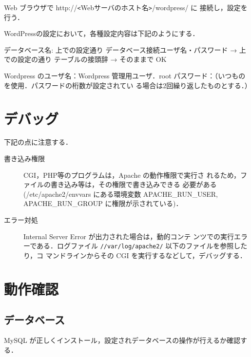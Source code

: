 Web ブラウザで http://\verb+<+Webサーバのホスト名\verb+>+/wordpress/ に
接続し，設定を行う．

WordPressの設定において，各種設定内容は下記のようにする．

\begin{cli}
データベース名: 上での設定通り
データベース接続ユーザ名・パスワード
  → 上での設定の通り
テーブルの接頭辞 → そのままで OK

Wordpress のユーザ名：Wordpress 管理用ユーザ．root
            パスワード：（いつものを使用．パスワードの桁数が設定されてい
            る場合は2回繰り返したものとする．）

\end{cli}


\section{デバッグ}

下記の点に注意する．

\begin{description}
\item[書き込み権限] CGI，PHP等のプログラムは，Apache の動作権限で実行さ
	    れるため，ファイルの書き込み等は，その権限で書き込みできる
	    必要がある(/etc/apache2/envvars にある環境変数
	    APACHE\_RUN\_USER, APACHE\_RUN\_GROUP に権限が示されている)．
 \item[エラー対処] Internal Server Error が出力された場合は，動的コンテ
	    ンツでの実行エラーである．ログファイル
	    \texttt{//var/log/apache2/} 以下のファイルを参照したり，コ
	    マンドラインからその CGI を実行するなどして，デバッグする．
\end{description}


\clearpage
\section{動作確認}

\subsection*{データベース}
MySQL が正しくインストール，設定されデータベースの操作が行えるか確認する．

%

